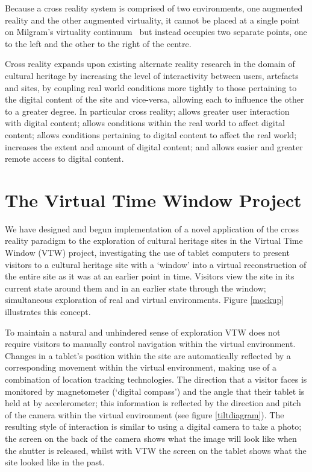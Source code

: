\documentclass[conference,a4paper]{IEEEtran}
\begin{document}
Because a cross reality system is comprised of two environments, one augmented reality and the other augmented virtuality, it cannot be placed at a single point on Milgram's virtuality continuum~\cite{Milgram1999} but instead occupies two separate points, one to the left and the other to the right of the centre.

Cross reality expands upon existing alternate reality research in the domain of cultural heritage by increasing the level of interactivity between users, artefacts and sites, by coupling real world conditions more tightly to those pertaining to the digital content of the site and vice-versa, allowing each to influence the other to a greater degree. In particular cross reality; allows greater user interaction with digital content; allows conditions within the real world to affect digital content; allows conditions pertaining to digital content to affect the real world; increases the extent and amount of digital content; and allows easier and greater remote access to digital content.

\section{The Virtual Time Window Project}
\label{sec:vtw}
We have designed and begun implementation of a novel application of the cross reality paradigm to the exploration of cultural heritage sites in the Virtual Time Window (VTW) project, investigating the use of tablet computers to present visitors to a cultural heritage site with a `window' into a virtual reconstruction of the entire site as it was at an earlier point in time. Visitors view the site in its current state around them and in an earlier state through the window; simultaneous exploration of real and virtual environments. Figure \ref{mockup} illustrates this concept.

To maintain a natural and unhindered sense of exploration VTW does not require visitors to manually control navigation within the virtual environment. Changes in a tablet's position within the site are automatically reflected by a corresponding movement within the virtual environment, making use of a combination of location tracking technologies. The direction that a visitor faces is monitored by magnetometer (`digital compass') and the angle that their tablet is held at by accelerometer; this information is reflected by the direction and pitch of the camera within the virtual environment (see figure \ref{tiltdiagram}). The resulting style of interaction is similar to using a digital camera to take a photo; the screen on the back of the camera shows what the image will look like when the shutter is released, whilst with VTW the screen on the tablet shows what the site looked like in the past.
\end{document}
